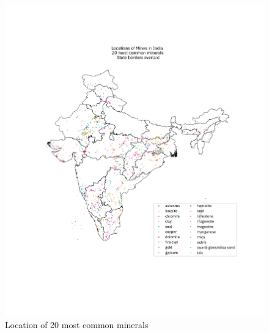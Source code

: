 \documentclass[12pt,reqno]{article}
\begin{document}
\begin{figure}
  \centering
  \includegraphics[]{Output/mine_map.pdf}
  \caption{Location of 20 most common minerals}
  \label{fig:mine_map}
\end{figure}
\end{document}
